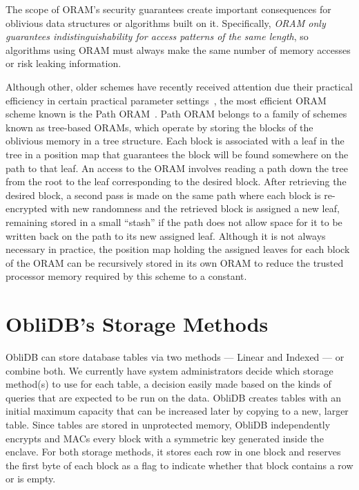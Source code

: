 \documentclass[letterpaper,twocolumn,10pt]{article}
\def\name/{ObliDB}
\begin{document}
The scope of ORAM's security guarantees create important consequences for oblivious data structures or algorithms built on it. Specifically, \emph{ORAM only guarantees indistinguishability for access patterns of the same length}, so algorithms using ORAM must always make the same number of memory accesses or risk leaking information.

Although other, older schemes have recently received attention due their practical efficiency in certain practical parameter settings~\cite{ZWR+16}, the most efficient ORAM scheme known is the Path ORAM~\cite{SDS+13}. Path ORAM belongs to a family of schemes known as tree-based ORAMs, which operate by storing the blocks of the oblivious memory in a tree structure. Each block is associated with a leaf in the tree in a position map that guarantees the block will be found somewhere on the path to that leaf. An access to the ORAM involves reading a path down the tree from the root to the leaf corresponding to the desired block. After retrieving the desired block, a second pass is made on the same path where each block is re-encrypted with new randomness and the retrieved block is assigned a new leaf, remaining stored in a small ``stash'' if the path does not allow space for it to be written back on the path to its new assigned leaf. Although it is not always necessary in practice, the position map holding the assigned leaves for each block of the ORAM can be recursively stored in its own ORAM to reduce the trusted processor memory required by this scheme to a constant.

\section{\name/'s Storage Methods}\label{oblivData}
\name/ can store database tables via two methods --- Linear and Indexed --- or combine both. We currently have system administrators decide which storage method(s) to use for each table, a decision easily made based on the kinds of queries that are expected to be run on the data. \name/ creates tables with an initial maximum capacity that can be increased later by copying to a new, larger table. Since tables are stored in unprotected memory, \name/ independently encrypts and MACs every block with a symmetric key generated inside the enclave. For both storage methods, it stores each row in one block and reserves the first byte of each block as a flag to indicate whether that block contains a row or is empty.
\end{document}
